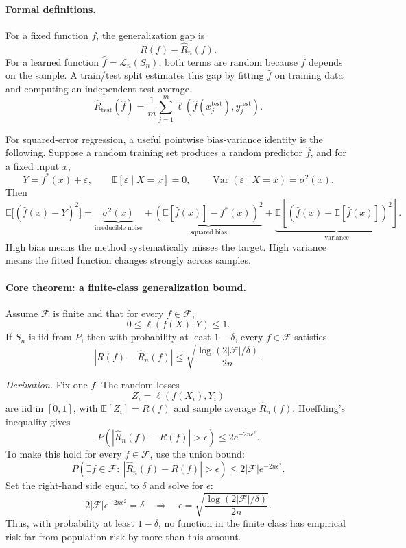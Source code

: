 \paragraph{Formal definitions.}
For a fixed function \(f\), the generalization gap is
\[
R(f)-\widehat R_n(f).
\]
For a learned function \(\widehat f=\mathcal L_n(S_n)\), both terms are random because \(\widehat f\) depends on the sample. A train/test split estimates this gap by fitting \(\widehat f\) on training data and computing an independent test average
\[
\widehat R_{\mathrm{test}}(\widehat f)
=\frac{1}{m}\sum_{j=1}^m \ell(\widehat f(x_j^{\mathrm{test}}),y_j^{\mathrm{test}}).
\]

For squared-error regression, a useful pointwise bias-variance identity is the following. Suppose a random training set produces a random predictor \(\widehat f\), and for a fixed input \(x\),
\[
Y=f^*(x)+\varepsilon,\qquad \mathbb E[\varepsilon\mid X=x]=0,\qquad \operatorname{Var}(\varepsilon\mid X=x)=\sigma^2(x).
\]
Then
\[
\mathbb E\bigl[(\widehat f(x)-Y)^2\bigr]
=
\underbrace{\sigma^2(x)}_{\text{irreducible noise}}
+
\underbrace{\left(\mathbb E[\widehat f(x)]-f^*(x)\right)^2}_{\text{squared bias}}
+
\underbrace{\mathbb E\left[(\widehat f(x)-\mathbb E[\widehat f(x)])^2\right]}_{\text{variance}}.
\]
High bias means the method systematically misses the target. High variance means the fitted function changes strongly across samples.

\paragraph{Core theorem: a finite-class generalization bound.}
Assume \(\mathcal F\) is finite and that for every \(f\in\mathcal F\),
\[
0\leq \ell(f(X),Y)\leq 1.
\]
If \(S_n\) is iid from \(P\), then with probability at least \(1-\delta\), every \(f\in\mathcal F\) satisfies
\[
\boxed{
\left|R(f)-\widehat R_n(f)\right|
\leq
\sqrt{\frac{\log(2|\mathcal F|/\delta)}{2n}}.
}
\]

\emph{Derivation.} Fix one \(f\). The random losses
\[
Z_i=\ell(f(X_i),Y_i)
\]
are iid in \([0,1]\), with \(\mathbb E[Z_i]=R(f)\) and sample average \(\widehat R_n(f)\). Hoeffding's inequality gives
\[
P\left(|\widehat R_n(f)-R(f)|>\epsilon\right)
\leq 2e^{-2n\epsilon^2}.
\]
To make this hold for every \(f\in\mathcal F\), use the union bound:
\[
P\left(\exists f\in\mathcal F:\ |\widehat R_n(f)-R(f)|>\epsilon\right)
\leq 2|\mathcal F|e^{-2n\epsilon^2}.
\]
Set the right-hand side equal to \(\delta\) and solve for \(\epsilon\):
\[
2|\mathcal F|e^{-2n\epsilon^2}=\delta
\quad\Longrightarrow\quad
\epsilon=\sqrt{\frac{\log(2|\mathcal F|/\delta)}{2n}}.
\]
Thus, with probability at least \(1-\delta\), no function in the finite class has empirical risk far from population risk by more than this amount.

